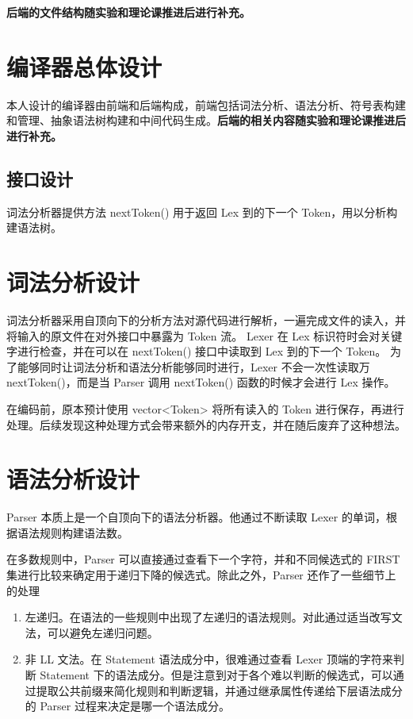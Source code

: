 \documentclass[a4paper]{article}
\begin{document}
	\textbf{后端的文件结构随实验和理论课推进后进行补充。}
	
	\section{编译器总体设计}
	
		本人设计的编译器由前端和后端构成，前端包括词法分析、语法分析、符号表构建和管理、抽象语法树构建和中间代码生成。\textbf{后端的相关内容随实验和理论课推进后进行补充。}
		
		\subsection{接口设计}
		
		词法分析器提供方法 nextToken() 用于返回 Lex 到的下一个 Token，用以分析构建语法树。
	
	\section{词法分析设计}
	
		词法分析器采用自顶向下的分析方法对源代码进行解析，一遍完成文件的读入，并将输入的原文件在对外接口中暴露为 Token 流。 
		Lexer 在 Lex 标识符时会对关键字进行检查，并在可以在 nextToken() 接口中读取到 Lex 到的下一个 Token。
        为了能够同时让词法分析和语法分析能够同时进行，Lexer 不会一次性读取万 nextToken()，而是当 Parser 调用 nextToken() 函数的时候才会进行 Lex 操作。
		
		在编码前，原本预计使用 vector<Token> 将所有读入的 Token 进行保存，再进行处理。后续发现这种处理方式会带来额外的内存开支，并在随后废弃了这种想法。
	
	\section{语法分析设计}

		Parser 本质上是一个自顶向下的语法分析器。他通过不断读取 Lexer 的单词，根据语法规则构建语法数。

        在多数规则中，Parser 可以直接通过查看下一个字符，并和不同候选式的 FIRST 集进行比较来确定用于递归下降的候选式。除此之外，Parser 还作了一些细节上的处理

        \begin{enumerate}
            \item 左递归。在语法的一些规则中出现了左递归的语法规则。对此通过适当改写文法，可以避免左递归问题。
            \item 非 LL 文法。在 Statement 语法成分中，很难通过查看 Lexer 顶端的字符来判断 Statement 下的语法成分。但是注意到对于各个难以判断的候选式，可以通过提取公共前缀来简化规则和判断逻辑，并通过继承属性传递给下层语法成分的 Parser 过程来决定是哪一个语法成分。
        \end{enumerate}
			
\end{document}
